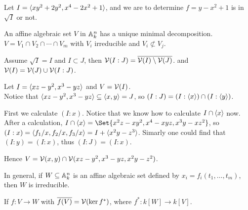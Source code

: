 \begin{example}
  Let $I = \langle xy^2 + 2y^2, x^4 - 2x^2 + 1 \rangle$, and we are to determine
  $f = y - x^2 + 1$ is in $\sqrt{I}$ or not.
\end{example}

\begin{prop}
  An affine algebraic set $V$ in $\mathbb{A}^n_k$ has a unique minimal decomposition.
  $V = V_1 \cap V_2 \cap \dotsm \cap V_m$ with $V_i$ irreducible and
  $V_i \not\subset V_j$.
\end{prop}

\begin{theorem}[Decomposition]
  Assume $\sqrt{I} = I$ and $I \subset J$, then $\mathcal{V}(I : J) = \overline{\mathcal{V}(I) \setminus  \mathcal{V}(J)}$.
  and $\mathcal{V}(I) = \mathcal{V}(J) \cup \mathcal{V}(I: J)$.
\end{theorem}

\begin{example}
  Let $I = \langle xz - y^2, x^3 - yz \rangle$ and $V = \mathcal{V}(I)$. \\

  Notice that $\langle xz - y^2 , x^3 - yz \rangle \subseteq \langle x, y \rangle = J$,
  so $(I: J) = (I: \langle x \rangle) \cap (I: \langle y\rangle)$.

  First we calculate $(I: x)$. Notice that we know how to calculate $I \cap \langle x\rangle$ now.
  After a calculation, $I \cap \gen{x} = \Set{x^2z - xy^2, x^4 - xyz, x^3y - xz^2}$,
  so $(I: x) = \langle f_1/x, f_2/x, f_3/x\rangle = I + \langle x^2y - z^3\rangle$.
  Simarly one could find that $(I: y) = (I: x)$, thus $(I: J) = (I: x)$.

  Hence $V = \mathcal{V}(x, y) \cap \mathcal{V}(xz-y^2, x^3-yz, x^2y - z^2)$.
\end{example}

\begin{prop}
  In general, if $W \subseteq \mathbb{A}_k^n$ is an affine algebraic set defined by
  $x_i = f_i(t_1, \dots, t_m)$, then $W$ is irreducible.
\end{prop}

\begin{prop}
  If $f : V \to W$ with $\overline{f(V)} = \mathcal{V}(\ker f^*)$, where $f^* : k[W] \to k[V]$.
\end{prop}
